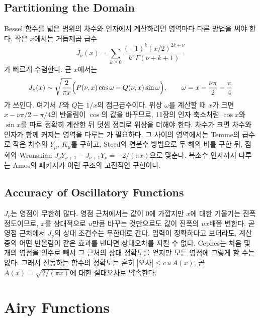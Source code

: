 \subsection{Partitioning the Domain}

Bessel 함수를 넓은 범위의 차수와 인자에서 계산하려면 영역마다 다른 방법을 써야 한다. 작은 $x$에서는 거듭제곱 급수
\[
J_\nu(x)=\sum_{k\ge0}\frac{(-1)^k(x/2)^{2k+\nu}}{k!\,\Gamma(\nu+k+1)}
\]
가 빠르게 수렴한다. 큰 $x$에서는 
\[
J_\nu(x)\sim\sqrt{\frac2{\pi x}}\Bigl(P(\nu,x)\cos\omega-Q(\nu,x)\sin\omega\Bigr),\qquad\omega=x-\frac{\nu\pi}2-\frac\pi4
\]
가 쓰인다. 여기서 $P$와 $Q$는 $1/x$의 점근급수이다. 위상 $\omega$를 계산할 때 $x$가 크면 $x-\nu\pi/2-\pi/4$의 반올림이 $\cos$의 값을 바꾸므로, 11장의 인자 축소처럼 $\cos x$와 $\sin x$를 따로 정확히 계산한 뒤 덧셈 정리로 위상을 더해야 한다. 차수가 크면 차수와 인자가 함께 커지는 영역을 다루는 가 필요하다\cite{dlmf}. 그 사이의 영역에서는 Temme의 급수로 작은 차수의 $Y_\mu$, $K_\mu$를 구하고\cite{temme1975bessel}, Steed의 연분수 방법으로 두 해의 비를 구한 뒤\cite{barnett1974,thompson1986coulomb}, 점화와 Wronskian $J_\nu Y_{\nu+1}-J_{\nu+1}Y_\nu=-2/(\pi x)$으로 맞춘다. 복소수 인자까지 다루는 Amos의 패키지가 이런 구조의 고전적인 구현이다\cite{amos1986}.

\subsection{Accuracy of Oscillatory Functions}

$J_\nu$는 영점이 무한히 많다. 영점 근처에서는 값이 $0$에 가깝지만 $x$에 대한 기울기는 진폭 정도이므로, $x$를 상대적으로 $u$만큼 바꾸는 것만으로도 값이 진폭의 $ux$배쯤 변한다. 곧 영점 근처에서 $J_\nu$의 상대 조건수는 무한대로 간다. 입력이 정확하다고 보더라도, 계산 중의 어떤 반올림이 같은 효과를 낸다면 상대오차를 지킬 수 없다. Cephes는 처음 몇 개의 영점을 인수로 빼서 그 근처의 상대 정확도를 얻지만 모든 영점에 그렇게 할 수는 없다. 그래서 진동하는 함수의 정확도는 흔히 $|\text{오차}|\le c\,u\,A(x)$, 곧  $A(x)=\sqrt{2/(\pi x)}$에 대한 절대오차로 약속한다.

\section{Airy Functions}
\label{sec:airy}

